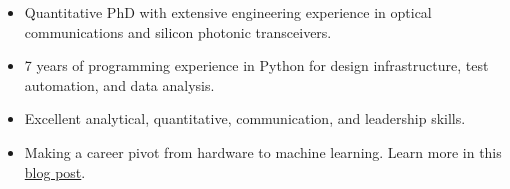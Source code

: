 

\begin{cvparagraph}

\begin{itemize}[leftmargin=*, noitemsep]
    \item Quantitative PhD with extensive engineering experience in optical communications and silicon photonic transceivers.
    \item 7 years of programming experience in Python for design infrastructure, test automation, and data analysis. 
    \item Excellent analytical, quantitative, communication, and leadership skills. 
    \item Making a career pivot from hardware to machine learning. Learn more in this \href{https://medium.com/@mpchang17/making-the-leap-from-hardware-to-machine-learning-d85853b59a05}{blog post}.
\end{itemize}
\end{cvparagraph}
